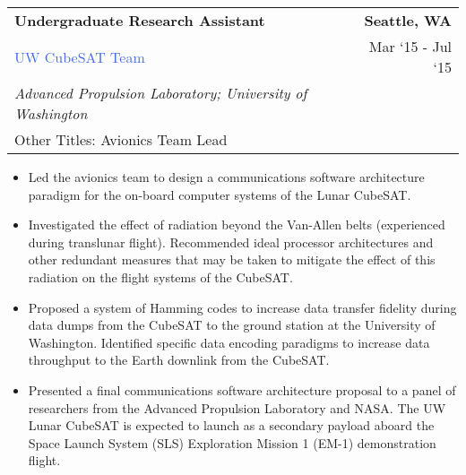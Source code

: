 \documentclass[10pt]{article}
\newcommand{\highlightcolor}{RoyalBlue}
\newcommand{\tabularxwidth}{\textwidth}
\begin{document}
    \begin{minipage}{\tabularxwidth}

        \begin{tabularx}{\tabularxwidth}{X r}
            \textbf{Undergraduate Research Assistant} & \textbf{Seattle, 
        WA} \\
            \textcolor{\highlightcolor}{UW CubeSAT Team} & 
        
    Mar ‘15 - 
    Jul ‘15 \\
            
                
                    \textit{Advanced Propulsion Laboratory; University of Washington} & \\
                
            
            
                Other Titles: Avionics Team Lead & \\
            
        \end{tabularx}

        \begin{itemize}[noitemsep, topsep=3pt, parsep=0pt, partopsep=0pt]
            
                \item 
    Led the avionics team to design a communications software architecture paradigm for the on-board computer systems of the Lunar CubeSAT.
            
                \item 
    Investigated the effect of radiation beyond the Van-Allen belts (experienced during translunar flight). Recommended ideal processor architectures and other redundant measures that may be taken to mitigate the effect of this radiation on the flight systems of the CubeSAT.
            
                \item 
    Proposed a system of Hamming codes to increase data transfer fidelity during data dumps from the CubeSAT to the ground station at the University of Washington. Identified specific data encoding paradigms to increase data throughput to the Earth downlink from the CubeSAT.
            
                \item 
    Presented a final communications software architecture proposal to a panel of researchers from the Advanced Propulsion Laboratory and NASA. The UW Lunar CubeSAT is expected to launch as a secondary payload aboard the Space Launch System (SLS) Exploration Mission 1 (EM-1) demonstration flight.
            
        \end{itemize}

        
            \vspace{.5em}
        

    \end{minipage}
    
\end{document}
